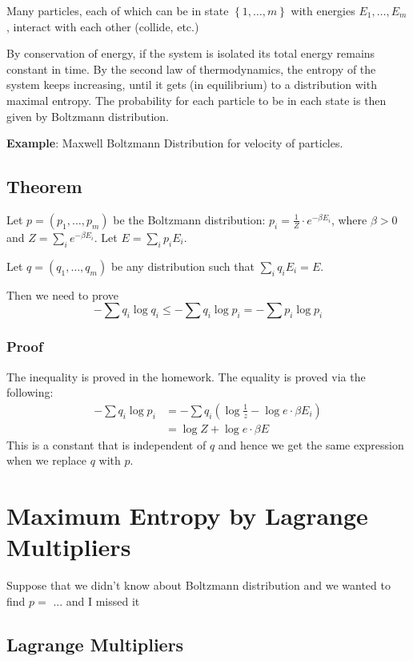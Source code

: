 \documentclass{article}
\begin{document}
Many particles, each of which can be in state $\left\{1,\ldots, m\right\}$ with energies $E_1,\ldots, E_m$, interact with each other (collide, etc.)

By conservation of energy, if the system is isolated its total energy remains constant in time. By the second law of thermodynamics, the entropy of the system keeps increasing, until it gets (in equilibrium) to a distribution with maximal entropy. The probability for each particle to be in each state is then given by Boltzmann distribution.

\textbf{Example}: Maxwell Boltzmann Distribution for velocity of particles.

\subsection{Theorem}

Let $p=\left(p_1,\ldots,p_m\right)$ be the Boltzmann distribution: $p_i=\frac{1}{Z}\cdot e^{-\beta E_i}$, where $\beta >0$ and $Z=\sum_i e^{-\beta E_i}$. Let $E=\sum_i p_i E_i$.

Let $q=\left(q_1,\ldots,q_m\right)$ be any distribution such that $\sum_i q_i E_i = E$.

Then we need to prove 
\[
-\sum q_i \log q_i \leq -\sum q_i \log p_i = -\sum p_i \log p_i
\]

\subsubsection{Proof}

The inequality is proved in the homework. The equality is proved via the following:
\begin{align*}
    -\sum q_i \log p_i &= -\sum q_i \left(\log \frac{1}{z}-\log e\cdot \beta E_i\right)\\
    &= \log Z + \log e\cdot \beta E
\end{align*}
This is a constant that is independent of $q$ and hence we get the same expression when we replace $q$ with $p$.

\section{Maximum Entropy by Lagrange Multipliers}

Suppose that we didn't know about Boltzmann distribution and we wanted to find $p=$ ... and I missed it

\subsection{Lagrange Multipliers}
\end{document}
